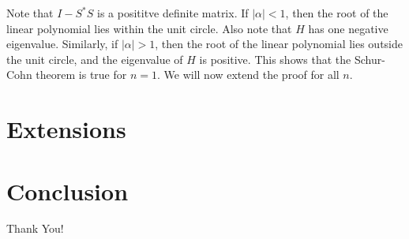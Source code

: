 \documentclass[twofold]{article}
\newcommand*\adj[1]{#1^*}
\newcommand*\abs[1]{\left \vert #1 \right\vert}
\theoremstyle{plain}
\theoremstyle{definition}
\begin{document}
Note that \(I - \adj{S} S\) is a posititve definite matrix. If \(\abs{\alpha} < 1\), then the root of the linear polynomial lies within the unit circle. Also note that \(H\) has one negative eigenvalue. Similarly, if \(\abs{\alpha} > 1\), then the root of the linear polynomial lies outside the unit circle, and the eigenvalue of \(H\) is positive. This shows that the Schur-Cohn theorem is true for \(n = 1\). We will now extend the proof for all \(n\). 
\section{Extensions}

\section{Conclusion}
Thank You!
\end{document}
